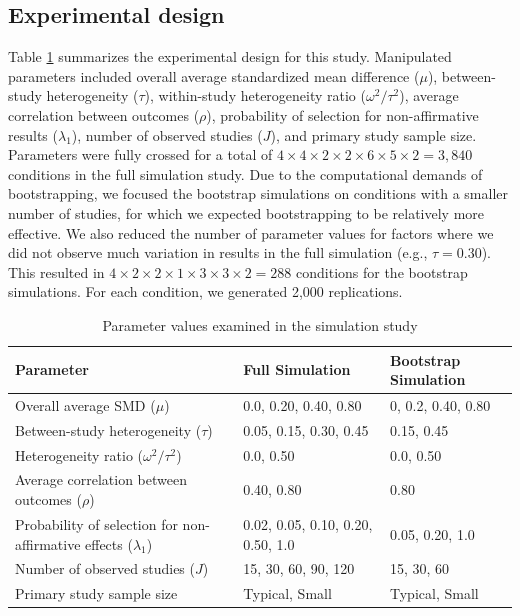 \documentclass[
  man, donotrepeattitle,floatsintext]{apa7}
\begin{document}
\subsection{Experimental design}\label{experimental-design}

Table \ref{tab:sim-design} summarizes the experimental design for this study.
Manipulated parameters included overall average standardized mean difference
(\(\mu\)), between-study heterogeneity (\(\tau\)), within-study heterogeneity ratio
(\(\omega^2 / \tau^2\)), average correlation between outcomes (\(\rho\)),
probability of selection for non-affirmative results (\(\lambda_1\)), number of observed studies (\(J\)), and primary study sample size.
Parameters were fully crossed for a total of \(4 \times 4 \times 2 \times 2 \times 6 \times 5 \times 2 = 3,840\) conditions in the full simulation study.
Due to the computational demands of bootstrapping, we focused the bootstrap simulations on conditions with a smaller number of studies, for which we expected bootstrapping to be relatively more effective.
We also reduced the number of parameter values for factors where we did
not observe much variation in results in the full simulation
(e.g., \(\tau = 0.30\)).
This resulted in \(4 \times 2 \times 2 \times 1 \times 3 \times 3 \times 2 = 288\) conditions for the bootstrap simulations.
For each condition, we generated 2,000 replications.

\begin{table}
\centering
\caption{\label{tab:sim-design}Parameter values examined in the simulation study}
\centering
\begin{tabular}[t]{>{\raggedright\arraybackslash}p{2.5in}ll}
\toprule
Parameter & Full Simulation & Bootstrap Simulation\\
\midrule
Overall average SMD ($\mu$) & 0.0, 0.20, 0.40, 0.80 & 0, 0.2, 0.40, 0.80\\
Between-study heterogeneity ($\tau$) & 0.05, 0.15, 0.30, 0.45 & 0.15, 0.45\\
Heterogeneity ratio ($\omega^2 / \tau^2$) & 0.0, 0.50 & 0.0, 0.50\\
Average correlation between outcomes ($\rho$) & 0.40, 0.80 & 0.80\\
Probability of selection for non-affirmative effects ($\lambda_1$) & 0.02, 0.05, 0.10, 0.20, 0.50, 1.0 & 0.05, 0.20, 1.0\\
\addlinespace
Number of observed studies ($J$) & 15, 30, 60, 90, 120 & 15, 30, 60\\
Primary study sample size & Typical, Small & Typical, Small\\
\bottomrule
\end{tabular}
\end{table}
\end{document}
